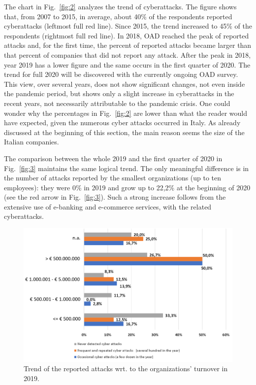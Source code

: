 \documentclass{easychair}
\begin{document}
The chart in Fig.~\ref{fig:2} analyzes the trend of cyberattacks.
The figure shows that, from 2007 to 2015, in average, about 40\% of the respondents
reported cyberattacks (leftmost full red line). Since 2015, the trend increased to 45\%
of the respondents (rightmost full red line). 
In 2018, OAD reached the peak of reported attacks and, for the first time, the percent of
reported attacks became larger than that percent of companies that did not report any attack.
After the peak 
in 2018, year 2019 has a lower figure and the same occurs in the first quarter of 2020.
The trend for full 2020 will be discovered with the currently ongoing OAD survey.
This view, over several years, does not show significant changes, not even inside
the pandemic period, but shows only a slight increase in cyberattacks 
in the recent years, not necessarily attributable to the pandemic crisis. One could wonder
why the percentages in Fig.~\ref{fig:2} are lower than what the reader would have expected, 
given the numerous cyber attacks occurred in Italy. As already discussed at the beginning of 
this section, the main reason seems the size of the Italian companies.

The comparison between the whole 2019 and the first quarter of 2020
in Fig.~\ref{fig:3} maintains the same logical trend. The only meaningful difference
is in the number of attacks reported by the smallest
organizations (up to ten employees): they were 0\% in 2019 and grow up to
22,2\% at the beginning of 2020 (see the red arrow in Fig.~\ref{fig:3}).
Such a strong increase follows from the extensive use of e-banking and 
e-commerce services, with the related cyberattacks.

\begin{figure}
	\begin{center}
		\includegraphics[scale=0.46]{pictures/fig4.png}
	\end{center}
  \caption{Trend of the reported attacks wrt. to the organizations' turnover in 2019.}
  \label{fig:4}
\end{figure}
\end{document}
